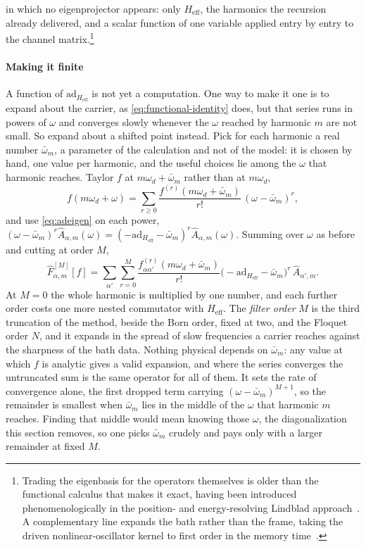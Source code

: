 \documentclass[a4paper,11pt]{article}
\newcommand{\eff}{\mathrm{eff}}
\newcommand{\ad}{\mathrm{ad}}
\begin{document}
in which no eigenprojector appears: only $H_\eff$, the harmonics the recursion already delivered, and a scalar function of one variable applied entry by entry to the channel matrix.\footnote{Trading the eigenbasis for the operators themselves is older than the functional calculus that makes it exact, having been introduced phenomenologically in the position- and energy-resolving Lindblad approach~\cite{Kirsanskas2018}. A complementary line expands the bath rather than the frame, taking the driven nonlinear-oscillator kernel to first order in the memory time~\cite{Wagner2026Generalized}.}

\paragraph{Making it finite}
A function of $\ad_{H_\eff}$ is not yet a computation. One way to make it one is to expand about the carrier, as \eqref{eq:functional-identity} does, but that series runs in powers of $\omega$ and converges slowly whenever the $\omega$ reached by harmonic $m$ are not small. So expand about a shifted point instead. Pick for each harmonic a real number $\bar\omega_m$, a parameter of the calculation and not of the model: it is chosen by hand, one value per harmonic, and the useful choices lie among the $\omega$ that harmonic reaches. Taylor $f$ at $m\omega_d+\bar\omega_m$ rather than at $m\omega_d$,
\begin{equation}\label{eq:centered-taylor}
  f(m\omega_d+\omega) = \sum_{r\ge0}\frac{f^{(r)}(m\omega_d+\bar\omega_m)}{r!}\,(\omega - \bar\omega_m)^{r},
\end{equation}
and use \eqref{eq:adeigen} on each power, $(\omega-\bar\omega_m)^r\hat A_{\alpha,m}(\omega) = (-\ad_{H_\eff}-\bar\omega_m)^r\hat A_{\alpha,m}(\omega)$. Summing over $\omega$ as before and cutting at order $M$,
\begin{equation}\label{eq:centered-filter}
  \hat F^{[M]}_{\alpha,m}[f]
  = \sum_{\alpha'}\sum_{r=0}^{M}\frac{f^{(r)}_{\alpha\alpha'}(m\omega_d + \bar\omega_m)}{r!}
    \big(-\ad_{H_\eff} - \bar\omega_m\big)^r\,\hat A_{\alpha',m}.
\end{equation}
At $M=0$ the whole harmonic is multiplied by one number, and each further order costs one more nested commutator with $H_\eff$. The \emph{filter order} $M$ is the third truncation of the method, beside the Born order, fixed at two, and the Floquet order $N$, and it expands in the spread of slow frequencies a carrier reaches against the sharpness of the bath data. Nothing physical depends on $\bar\omega_m$: any value at which $f$ is analytic gives a valid expansion, and where the series converges the untruncated sum is the same operator for all of them. It sets the rate of convergence alone, the first dropped term carrying $(\omega-\bar\omega_m)^{M+1}$, so the remainder is smallest when $\bar\omega_m$ lies in the middle of the $\omega$ that harmonic $m$ reaches. Finding that middle would mean knowing those $\omega$, the diagonalization this section removes, so one picks $\bar\omega_m$ crudely and pays only with a larger remainder at fixed $M$.
\end{document}
